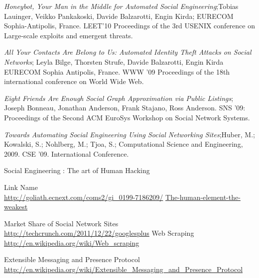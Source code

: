 \begin{thebibliography}{99}



\emph{Honeybot, Your Man in the Middle for Automated Social Engineering};Tobias Lauinger, Veikko Pankakoski, Davide Balzarotti, Engin Kirda; EURECOM Sophia-Antipolis, France. LEET’10 Proceedings of the 3rd USENIX conference on Large-scale exploits and emergent threats.

\emph{All Your Contacts Are Belong to Us: Automated Identity Theft Attacks on Social Networks}; Leyla Bilge, Thorsten Strufe, Davide Balzarotti, Engin Kirda EURECOM Sophia Antipolis, France. WWW ’09 Proceedings of the 18th international conference on World Wide Web.

\emph{Eight Friends Are Enough Social Graph Approximation via Public Listings}; Joseph Bonneau, Jonathan Anderson, Frank Stajano, Ross Anderson. SNS ’09: Proceedings of the Second ACM EuroSys Workshop on Social Network Systems.

\emph{Towards Automating Social Engineering Using Social Networking Sites};Huber, M.; Kowalski, S.; Nohlberg, M.; Tjoa, S.; Computational Science and Engineering, 2009. CSE ’09. International Conference.

Social Engineering : The art of Human Hacking


Link Name \\ \url{http://goliath.ecnext.com/coms2/gi_0199-7186209/}
\url{The-human-element-the-weakest}


Market Share of Social Network Sites \\ \url{http://techcrunch.com/2011/12/22/googlesplus}
Web Scraping \\ \url{http://en.wikipedia.org/wiki/Web_scraping}

Extensible Messaging and Presence Protocol\\ \url{http://en.wikipedia.org/wiki/Extensible_Messaging_and_Presence_Protocol}


\end{thebibliography}
